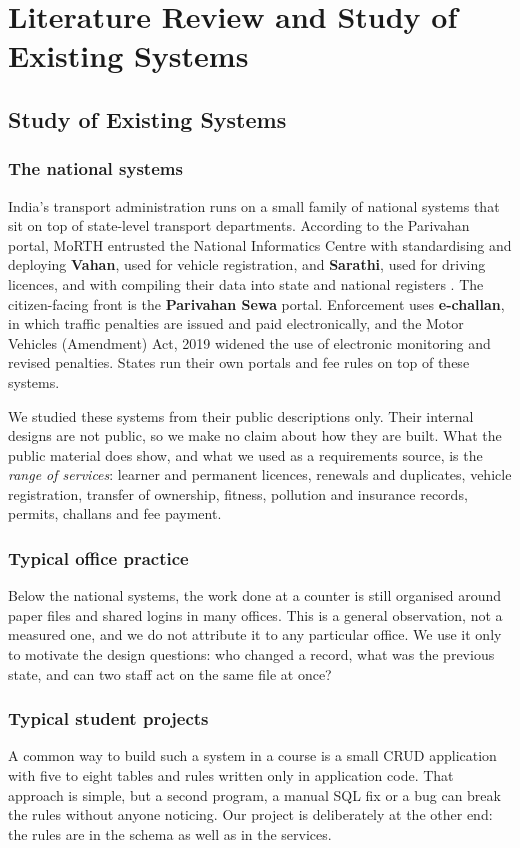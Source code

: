 \chapter{Literature Review and Study of Existing Systems}\label{ch:lit}

\section{Study of Existing Systems}
\subsection{The national systems}
India's transport administration runs on a small family of national systems that sit on
top of state-level transport departments. According to the Parivahan portal, MoRTH
entrusted the National Informatics Centre with standardising and deploying
\textbf{Vahan}, used for vehicle registration, and \textbf{Sarathi}, used for driving
licences, and with compiling their data into state and national registers
\cite{parivahan-about}. The citizen-facing front is the \textbf{Parivahan Sewa} portal.
Enforcement uses \textbf{e-challan}, in which traffic penalties are issued and paid
electronically, and the Motor Vehicles (Amendment) Act, 2019 \cite{mva2019} widened the
use of electronic monitoring and revised penalties. States run their own portals and
fee rules on top of these systems.

We studied these systems from their public descriptions only. Their internal designs
are not public, so we make no claim about how they are built. What the public material
does show, and what we used as a requirements source, is the \emph{range of services}:
learner and permanent licences, renewals and duplicates, vehicle registration, transfer
of ownership, fitness, pollution and insurance records, permits, challans and fee
payment.

\subsection{Typical office practice}
Below the national systems, the work done at a counter is still organised around
paper files and shared logins in many offices. This is a general observation, not a
measured one, and we do not attribute it to any particular office. We use it only to
motivate the design questions: who changed a record, what was the previous state, and
can two staff act on the same file at once?

\subsection{Typical student projects}
A common way to build such a system in a course is a small CRUD application with five to
eight tables and rules written only in application code. That approach is simple, but a
second program, a manual SQL fix or a bug can break the rules without anyone noticing.
Our project is deliberately at the other end: the rules are in the schema as well as in
the services.

